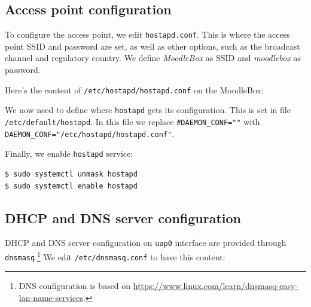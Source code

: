 \documentclass[12pt]{article}
\begin{document}
\subsection{Access point configuration}

To configure the access point, we edit \lstinline{hostapd.conf}.
This is where the access point SSID and password are set, as well as other options, such as the broadcast channel and regulatory country.
We define \emph{MoodleBox} as SSID and \emph{moodlebox} as password.

Here's the content of \lstinline{/etc/hostapd/hostapd.conf} on the MoodleBox:

We now need to define where \lstinline{hostapd} gets its configuration.
This is set in file \lstinline{/etc/default/hostapd}.
In this file we replace \lstinline{#DAEMON_CONF=""} with \lstinline{DAEMON_CONF="/etc/hostapd/hostapd.conf"}.

Finally, we enable \lstinline{hostapd} service:
\begin{lstlisting}[language=bash]
$ sudo systemctl unmask hostapd
$ sudo systemctl enable hostapd
\end{lstlisting}

\subsection{DHCP and DNS server configuration}

DHCP and DNS server configuration on \lstinline{uap0} interface are provided through \lstinline{dnsmasq}.\footnote{DNS configuration is based on \url{https://www.linux.com/learn/dnsmasq-easy-lan-name-services}.}
We edit  \lstinline{/etc/dnsmasq.conf} to have this content:
\end{document}
